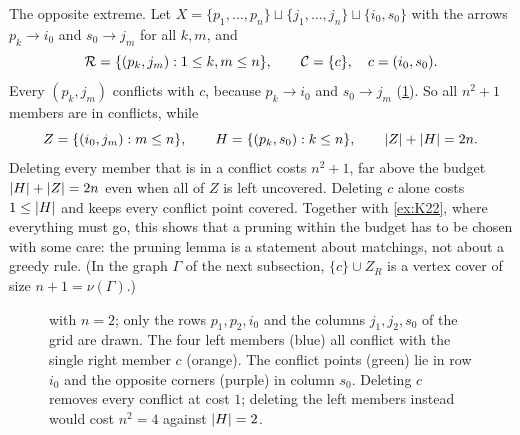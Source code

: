 \begin{example}\label{ex:star}
The opposite extreme. Let
$X=\{p_1,\dots,p_n\}\sqcup\{j_1,\dots,j_n\}\sqcup\{i_0,s_0\}$ with the
arrows $p_k\to i_0$ and $s_0\to j_m$ for all $k,m$, and
\[
 \mathcal R=\{(p_k,j_m):1\le k,m\le n\},\qquad\mathcal C=\{c\},\quad c=(i_0,s_0).
\]
Every $(p_k,j_m)$ conflicts with $c$, because $p_k\to i_0$ and $s_0\to j_m$
(\cref{fig:star}). So all $n^2+1$ members are in conflicts, while
\[
 Z=\{(i_0,j_m):m\le n\},\qquad H=\{(p_k,s_0):k\le n\},\qquad \lvert Z\rvert+\lvert H\rvert=2n.
\]
Deleting every member that is in a conflict costs $n^2+1$, far above the
budget $\lvert H\rvert+\lvert Z\rvert=2n$ even when all of $Z$ is left uncovered. Deleting
$c$ alone costs $1\le\lvert H\rvert$ and keeps every conflict point covered.
Together with \cref{ex:K22}, where everything must go, this shows that a
pruning within the budget has to be chosen with some care: the pruning
lemma is a statement about matchings, not about a greedy rule. (In the
graph $\Gamma$ of the next subsection, $\{c\}\cup Z_R$ is a vertex cover of
size $n+1=\nu(\Gamma)$.)
\end{example}

\begin{figure}[ht]
\centering
{}
\caption{ with $n=2$; only the rows $p_1,p_2,i_0$ and the
columns $j_1,j_2,s_0$ of the grid are drawn. The four left members (blue)
all conflict with the single right member $c$ (orange). The conflict points
(green) lie in row $i_0$ and the opposite corners (purple) in column $s_0$.
Deleting $c$ removes every conflict at cost $1$; deleting the left members
instead would cost $n^2=4$ against $\lvert H\rvert=2$.}
\label{fig:star}
\end{figure}

